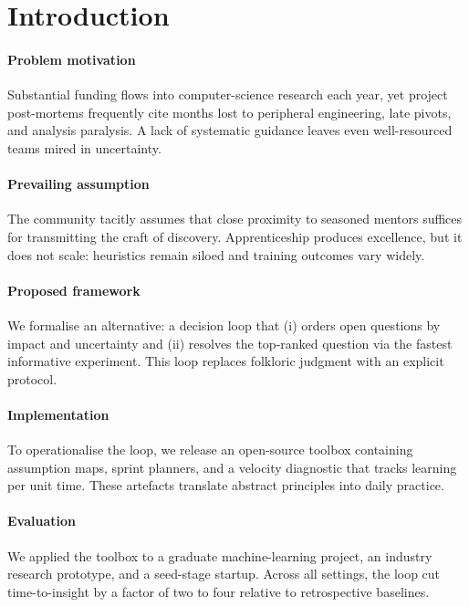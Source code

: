 
\section{Introduction}\label{sec:introduction}

\paragraph{Problem motivation}
Substantial funding flows into computer-science research each year, yet project post-mortems frequently cite months lost to peripheral engineering, late pivots, and analysis paralysis.
A lack of systematic guidance leaves even well-resourced teams mired in uncertainty.

\paragraph{Prevailing assumption}
The community tacitly assumes that close proximity to seasoned mentors suffices for transmitting the craft of discovery.
Apprenticeship produces excellence, but it does not scale: heuristics remain siloed and training outcomes vary widely.

\paragraph{Proposed framework}
We formalise an alternative: a decision loop that (i) orders open questions by impact and uncertainty and (ii) resolves the top-ranked question via the fastest informative experiment.
This loop replaces folkloric judgment with an explicit protocol.

\paragraph{Implementation}
To operationalise the loop, we release an open-source toolbox containing assumption maps, sprint planners, and a velocity diagnostic that tracks learning per unit time.
These artefacts translate abstract principles into daily practice.

\paragraph{Evaluation}
We applied the toolbox to a graduate machine-learning project, an industry research prototype, and a seed-stage startup.
Across all settings, the loop cut time-to-insight by a factor of two to four relative to retrospective baselines.

